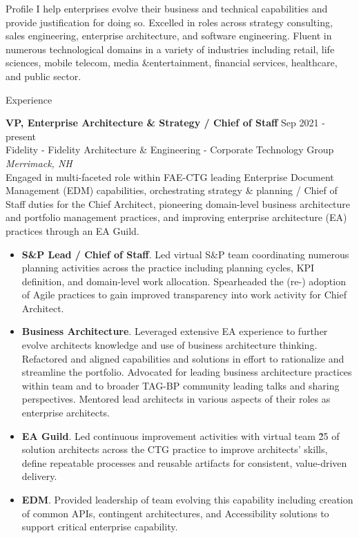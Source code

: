\documentclass{resume} %
\begin{document}
\begin{rSection}{Profile}
I help enterprises evolve their business and technical capabilities and provide justification for doing so. Excelled in roles across strategy consulting, sales engineering, enterprise architecture, and software engineering. Fluent in numerous technological domains in a variety of industries including retail, life sciences, mobile telecom, media \&entertainment, financial services, healthcare, and public sector.

\end{rSection}

\begin{rSection}{Experience}

\textbf{VP, Enterprise Architecture \& Strategy / Chief of Staff} \hfill Sep 2021 - present\\
Fidelity - Fidelity Architecture \& Engineering - Corporate Technology Group \hfill \textit{Merrimack, NH}\\
Engaged in multi-faceted role within FAE-CTG leading Enterprise Document Management (EDM) capabilities, orchestrating strategy \& planning / Chief of Staff duties for the Chief Architect, pioneering domain-level business architecture and portfolio management practices, and improving enterprise architecture (EA) practices through an EA Guild.

\begin{itemize}
   \itemsep -3pt {} 
   \item \textbf{S\&P Lead / Chief of Staff}. Led virtual S\&P team coordinating numerous planning activities across the practice including planning cycles, KPI definition, and domain-level work allocation. Spearheaded the (re-) adoption of Agile practices to gain improved transparency into work activity for Chief Architect. 
   \item \textbf{Business Architecture}. Leveraged extensive EA experience to further evolve architects knowledge and use of business architecture thinking. Refactored and aligned capabilities and solutions in effort to rationalize and streamline the portfolio. Advocated for leading business architecture practices within team and to broader TAG-BP community leading talks and sharing perspectives. Mentored lead architects in various aspects of their roles as enterprise architects.
   \item \textbf{EA Guild}. Led continuous improvement activities with virtual team \~25 of solution architects across the CTG practice to improve architects' skills, define repeatable processes and reusable artifacts for consistent, value-driven delivery.
   \item \textbf{EDM}. Provided leadership of team evolving this capability including creation of common APIs, contingent architectures, and Accessibility solutions to support critical enterprise capability. 
 \end{itemize}


\end{rSection}
\end{document}
